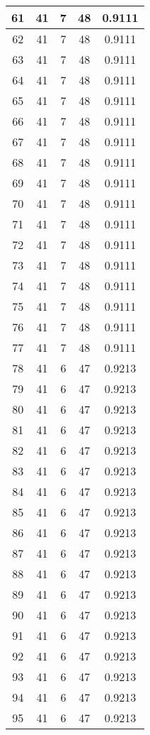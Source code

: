 \documentclass[letterpaper, 12pt]{article}
\begin{document}
\begin{longtable}{|c|c|c|c|c|}
61 & 41 & 7 & 48 & 0.9111 \\
\hline
62 & 41 & 7 & 48 & 0.9111 \\
\hline
63 & 41 & 7 & 48 & 0.9111 \\
\hline
64 & 41 & 7 & 48 & 0.9111 \\
\hline
65 & 41 & 7 & 48 & 0.9111 \\
\hline
66 & 41 & 7 & 48 & 0.9111 \\
\hline
67 & 41 & 7 & 48 & 0.9111 \\
\hline
68 & 41 & 7 & 48 & 0.9111 \\
\hline
69 & 41 & 7 & 48 & 0.9111 \\
\hline
70 & 41 & 7 & 48 & 0.9111 \\
\hline
71 & 41 & 7 & 48 & 0.9111 \\
\hline
72 & 41 & 7 & 48 & 0.9111 \\
\hline
73 & 41 & 7 & 48 & 0.9111 \\
\hline
74 & 41 & 7 & 48 & 0.9111 \\
\hline
75 & 41 & 7 & 48 & 0.9111 \\
\hline
76 & 41 & 7 & 48 & 0.9111 \\
\hline
77 & 41 & 7 & 48 & 0.9111 \\
\hline
78 & 41 & 6 & 47 & 0.9213 \\
\hline
79 & 41 & 6 & 47 & 0.9213 \\
\hline
80 & 41 & 6 & 47 & 0.9213 \\
\hline
81 & 41 & 6 & 47 & 0.9213 \\
\hline
82 & 41 & 6 & 47 & 0.9213 \\
\hline
83 & 41 & 6 & 47 & 0.9213 \\
\hline
84 & 41 & 6 & 47 & 0.9213 \\
\hline
85 & 41 & 6 & 47 & 0.9213 \\
\hline
86 & 41 & 6 & 47 & 0.9213 \\
\hline
87 & 41 & 6 & 47 & 0.9213 \\
\hline
88 & 41 & 6 & 47 & 0.9213 \\
\hline
89 & 41 & 6 & 47 & 0.9213 \\
\hline
90 & 41 & 6 & 47 & 0.9213 \\
\hline
91 & 41 & 6 & 47 & 0.9213 \\
\hline
92 & 41 & 6 & 47 & 0.9213 \\
\hline
93 & 41 & 6 & 47 & 0.9213 \\
\hline
94 & 41 & 6 & 47 & 0.9213 \\
\hline
95 & 41 & 6 & 47 & 0.9213 \\

\end{longtable}
\end{document}
